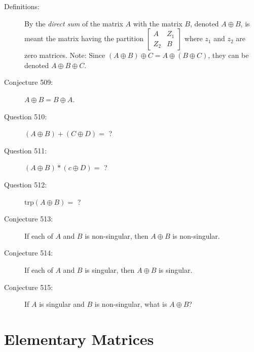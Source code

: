 \documentclass{article}
\begin{document}
\begin{description}

  \item[Definitions:] By the \emph{direct sum} of the matrix $A$ with the matrix $B$, denoted $A \oplus B$, is meant the matrix having the partition 
    $\begin{bmatrix}
      A & Z_{1} \\
      Z_{2} & B
    \end{bmatrix}$ 
    where $z_{1}$ and $z_{2}$ are zero matrices. Note: Since $(A \oplus B) \oplus C = A \oplus(B \oplus C)$, they can be denoted $A \oplus B \oplus C$.

  \item[Conjecture 509:] $A \oplus B=B \oplus A$.

  \item[Question 510:] $(A \oplus B)+(C \oplus D) =$ ?

  \item[Question 511:] $(A \oplus B)*(c \oplus D) =$ ?

  \item[Question 512:] $\text{trp} (A \oplus B) =$ ?

  \item[Conjecture 513:] If each of $A$ and $B$ is non-singular, then $A \oplus B$ is non-singular.

  \item[Conjecture 514:] If each of $A$ and $B$ is singular, then $A \oplus B$ is singular.

  \item[Conjecture 515:] If $A$ is singular and $B$ is non-singular, what is $A \oplus B$?

\end{description}


\section{Elementary Matrices}
\end{document}

